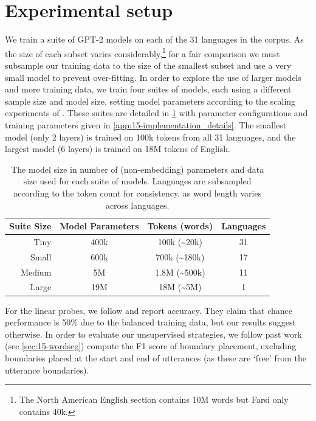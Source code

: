 \section{Experimental setup}

We train a suite of GPT-2 models on each of the 31 languages in the \ipachildes corpus. As the size of each subset varies considerably,\footnote{The North American English section contains 10M words but Farsi only contains 40k.} for a fair comparison we must subsample our training data to the size of the smallest subset and use a very small model to prevent over-fitting. In order to explore the use of larger models and more training data, we train four suites of models, each using a different sample size and model size, setting model parameters according to the scaling experiments of \citet{goriely2025}. These suites are detailed in \cref{tab:15-suites} with parameter configurations and training parameters given in \cref{app:15-implementation_details}. The smallest model (only 2 layers) is trained on 100k tokens from all 31 languages, and the largest model (6 layers) is trained on 18M tokens of English. 

\setlength{\tabcolsep}{2pt}
\begin{table}[t]
    \centering
    \small
    \begin{tabular}{rccc}
    \toprule
        Suite Size & Model Parameters & Tokens (words) & Languages \\
       \midrule
       Tiny & 400k & 100k (\textasciitilde20k) & 31 \\
       Small & 600k & 700k (\textasciitilde180k) & 17 \\
       Medium & 5M & 1.8M (\textasciitilde500k) & 11 \\
       Large & 19M & 18M (\textasciitilde5M) & 1 \\
       \bottomrule
    \end{tabular}
    \caption{The model size in number of (non-embedding) parameters and data size used for each suite of models. Languages are subsampled according to the token count for consistency, as word length varies across languages.}
    \label{tab:15-suites}
\end{table}

For the linear probes, we follow \citet{hahn-baroni-2019-tabula} and report accuracy. They claim that chance performance is 50\% due to the balanced training data, but our results suggest otherwise. In order to evaluate our unsupervised strategies, we follow past work (see \cref{sec:15-wordseg}) compute the F1 score of boundary placement, excluding boundaries placed at the start and end of utterances (as these are `free' from the utterance boundaries).

